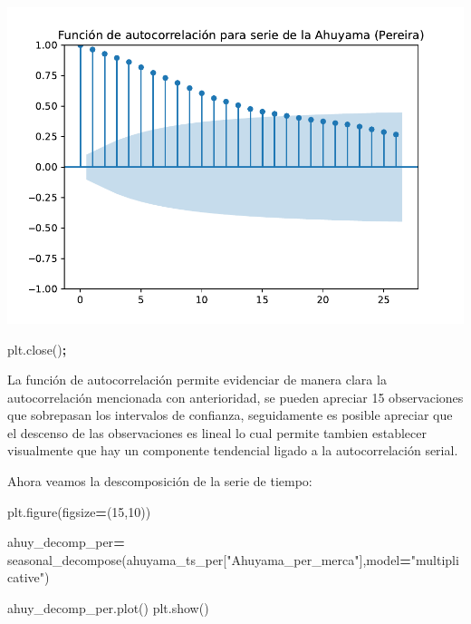 \documentclass[
]{book}
\newenvironment{Shaded}{\begin{snugshade}}{\end{snugshade}}
\newcommand{\DecValTok}[1]{\textcolor[rgb]{0.00,0.00,0.81}{#1}}
\newcommand{\NormalTok}[1]{#1}
\newcommand{\OperatorTok}[1]{\textcolor[rgb]{0.81,0.36,0.00}{\textbf{#1}}}
\newcommand{\StringTok}[1]{\textcolor[rgb]{0.31,0.60,0.02}{#1}}
\begin{document}
\includegraphics{bookdown-demo_files/figure-latex/unnamed-chunk-87-61.pdf}

\begin{Shaded}
\begin{Highlighting}[]
\NormalTok{plt.close()}\OperatorTok{;}
\end{Highlighting}
\end{Shaded}

La función de autocorrelación permite evidenciar de manera clara la autocorrelación mencionada con anterioridad, se pueden apreciar 15 observaciones que sobrepasan los intervalos de confianza, seguidamente es posible apreciar que el descenso de las observaciones es lineal lo cual permite tambien establecer visualmente que hay un componente tendencial ligado a la autocorrelación serial.

Ahora veamos la descomposición de la serie de tiempo:

\begin{Shaded}
\begin{Highlighting}[]

\NormalTok{plt.figure(figsize}\OperatorTok{=}\NormalTok{(}\DecValTok{15}\NormalTok{,}\DecValTok{10}\NormalTok{))}

\NormalTok{ahuy\_decomp\_per}\OperatorTok{=}\NormalTok{ seasonal\_decompose(ahuyama\_ts\_per[}\StringTok{"Ahuyama\_per\_merca"}\NormalTok{],model}\OperatorTok{=}\StringTok{"multiplicative"}\NormalTok{)}

\NormalTok{ahuy\_decomp\_per.plot()}
\NormalTok{plt.show()}
\end{Highlighting}
\end{Shaded}
\end{document}
